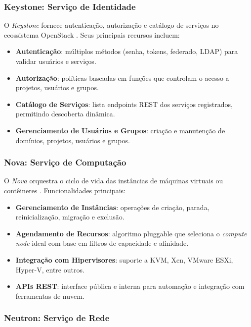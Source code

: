 \subsubsection{Keystone: Serviço de Identidade}

O \textit{Keystone} fornece autenticação, autorização e catálogo de serviços no ecossistema OpenStack \cite{openstack_keystone}. Seus principais recursos incluem:
\begin{itemize}
    \item \textbf{Autenticação}: múltiplos métodos (senha, tokens, federado, LDAP) para validar usuários e serviços.
    \item \textbf{Autorização}: políticas baseadas em funções que controlam o acesso a projetos, usuários e grupos.
    \item \textbf{Catálogo de Serviços}: lista endpoints REST dos serviços registrados, permitindo descoberta dinâmica.
    \item \textbf{Gerenciamento de Usuários e Grupos}: criação e manutenção de domínios, projetos, usuários e grupos.
\end{itemize}

\subsubsection{Nova: Serviço de Computação}

O \textit{Nova} orquestra o ciclo de vida das instâncias de máquinas virtuais ou contêineres \cite{openstack_nova}. Funcionalidades principais:
\begin{itemize}
    \item \textbf{Gerenciamento de Instâncias}: operações de criação, parada, reinicialização, migração e exclusão.
    \item \textbf{Agendamento de Recursos}: algoritmo pluggable que seleciona o \textit{compute node} ideal com base em filtros de capacidade e afinidade.
    \item \textbf{Integração com Hipervisores}: suporte a KVM, Xen, VMware ESXi, Hyper-V, entre outros.
    \item \textbf{APIs REST}: interface pública e interna para automação e integração com ferramentas de nuvem.
\end{itemize}

\subsubsection{Neutron: Serviço de Rede}

